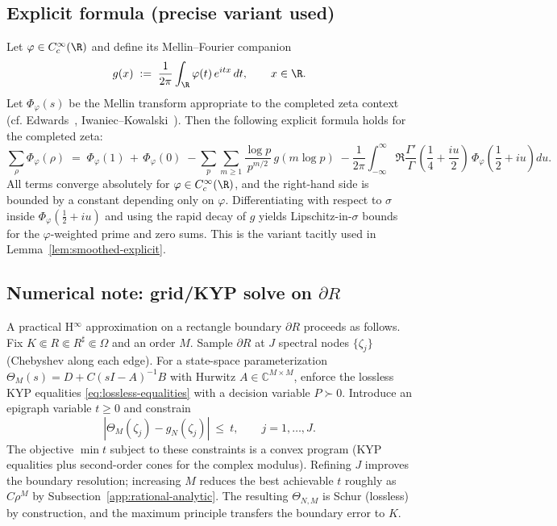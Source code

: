 \documentclass[11pt]{article}
\theoremstyle{remark}
\newcommand{\C}{\mathbb{C}}
\begin{document}
\subsection{Explicit formula (precise variant used)}\label{app:explicit-formula}
Let $\varphi\in C_c^{\infty}(\R)$ and define its Mellin--Fourier companion
\[
 g(x)\;:=\;\frac{1}{2\pi}\int_{\R} \varphi(t)\,e^{itx}\,dt,\qquad x\in\R.
\]
Let $\Phi_{\varphi}(s)$ be the Mellin transform appropriate to the completed zeta context (cf. Edwards~\cite[Ch.~1, §5]{Edwards}, Iwaniec--Kowalski~\cite[Ch.~5]{IwaniecKowalski}). Then the following explicit formula holds for the completed zeta:
\[
 \sum_{\rho} \Phi_{\varphi}(\rho)\;=\;\Phi_{\varphi}(1)\,+\,\Phi_{\varphi}(0)\;-
 \sum_{p}\sum_{m\ge 1} \frac{\log p}{p^{m/2}}\,g(m\log p)\;-
 \frac{1}{2\pi}\int_{-\infty}^{\infty} \Re\frac{\Gamma'}{\Gamma}\!\left(\frac{1}{4}+\frac{iu}{2}\right)\,\Phi_{\varphi}\!\left(\frac12+iu\right)du.
\]
All terms converge absolutely for $\varphi\in C_c^{\infty}(\R)$, and the right-hand side is bounded by a constant depending only on $\varphi$. Differentiating with respect to $\sigma$ inside $\Phi_{\varphi}(\tfrac12+iu)$ and using the rapid decay of $g$ yields Lipschitz-in-$\sigma$ bounds for the $\varphi$-weighted prime and zero sums. This is the variant tacitly used in Lemma~\ref{lem:smoothed-explicit}.

\subsection{Numerical note: grid/KYP solve on $\partial R$}\label{app:numerics}
A practical H$^\infty$ approximation on a rectangle boundary $\partial R$ proceeds as follows. Fix $K\Subset R\Subset R^\sharp\Subset\Omega$ and an order $M$. Sample $\partial R$ at $J$ spectral nodes $\{\zeta_j\}$ (Chebyshev along each edge). For a state-space parameterization $\Theta_M(s)=D+C(sI-A)^{-1}B$ with Hurwitz $A\in\C^{M\times M}$, enforce the lossless KYP equalities \eqref{eq:lossless-equalities} with a decision variable $P\succ 0$. Introduce an epigraph variable $t\ge 0$ and constrain
\[
 |\Theta_M(\zeta_j)-g_N(\zeta_j)|\ \le\ t,\qquad j=1,\dots,J.
\]
The objective $\min t$ subject to these constraints is a convex program (KYP equalities plus second-order cones for the complex modulus). Refining $J$ improves the boundary resolution; increasing $M$ reduces the best achievable $t$ roughly as $C\rho^M$ by Subsection~\ref{app:rational-analytic}. The resulting $\Theta_{N,M}$ is Schur (lossless) by construction, and the maximum principle transfers the boundary error to $K$.
\end{document}
